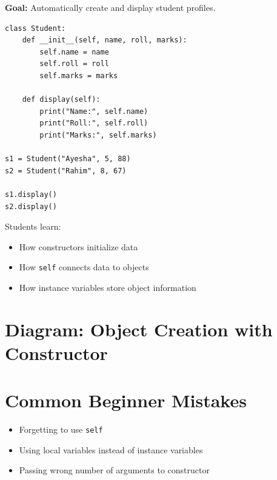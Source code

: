 \textbf{Goal:} Automatically create and display student profiles.

\begin{verbatim}
class Student:
    def __init__(self, name, roll, marks):
        self.name = name
        self.roll = roll
        self.marks = marks

    def display(self):
        print("Name:", self.name)
        print("Roll:", self.roll)
        print("Marks:", self.marks)

s1 = Student("Ayesha", 5, 88)
s2 = Student("Rahim", 8, 67)

s1.display()
s2.display()
\end{verbatim}

Students learn:
\begin{itemize}
    \item How constructors initialize data
    \item How \texttt{self} connects data to objects
    \item How instance variables store object information
\end{itemize}

\section{Diagram: Object Creation with Constructor}

\begin{center}
\end{center}

\section{Common Beginner Mistakes}

\begin{itemize}
    \item Forgetting to use \texttt{self}
    \item Using local variables instead of instance variables
    \item Passing wrong number of arguments to constructor
\end{itemize}

